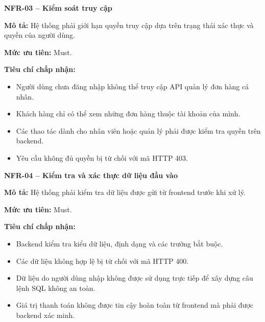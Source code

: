 \documentclass[a4paper]{article}
\begin{document}
\par\ifdim\dimexpr\pagegoal-\pagetotal\relax<6\baselineskip\newpage\fi
{}

\noindent\textbf{NFR-03 – Kiểm soát truy cập}\par\nopagebreak
\begin{list}{}{%
    \setlength{\leftmargin}{0.8cm}%
    \setlength{\rightmargin}{0pt}%
    \setlength{\labelwidth}{0pt}%
    \setlength{\labelsep}{0pt}%
    \setlength{\itemindent}{0pt}%
    \setlength{\listparindent}{0pt}%
    \setlength{\itemsep}{5pt}%
    \setlength{\parsep}{0pt}%
    \setlength{\topsep}{5pt}%
}
\item[] \textbf{Mô tả:} Hệ thống phải giới hạn quyền truy cập dựa trên trạng thái xác thực và quyền của người dùng.
\item[] \textbf{Mức ưu tiên:} Must.
\item[] \textbf{Tiêu chí chấp nhận:} 
\begin{itemize}
\item Người dùng chưa đăng nhập không thể truy cập API quản lý đơn hàng cá nhân.
\item Khách hàng chỉ có thể xem những đơn hàng thuộc tài khoản của mình.
\item Các thao tác dành cho nhân viên hoặc quản lý phải được kiểm tra quyền trên backend.
\item Yêu cầu không đủ quyền bị từ chối với mã HTTP 403.
\end{itemize}
\end{list}

\par\ifdim\dimexpr\pagegoal-\pagetotal\relax<6\baselineskip\newpage\fi
{}

\noindent\textbf{NFR-04 – Kiểm tra và xác thực dữ liệu đầu vào}\par\nopagebreak
\begin{list}{}{%
    \setlength{\leftmargin}{0.8cm}%
    \setlength{\rightmargin}{0pt}%
    \setlength{\labelwidth}{0pt}%
    \setlength{\labelsep}{0pt}%
    \setlength{\itemindent}{0pt}%
    \setlength{\listparindent}{0pt}%
    \setlength{\itemsep}{5pt}%
    \setlength{\parsep}{0pt}%
    \setlength{\topsep}{5pt}%
}
\item[] \textbf{Mô tả:} Hệ thống phải kiểm tra dữ liệu được gửi từ frontend trước khi xử lý.
\item[] \textbf{Mức ưu tiên:} Must.
\item[] \textbf{Tiêu chí chấp nhận:} 
\begin{itemize}
\item Backend kiểm tra kiểu dữ liệu, định dạng và các trường bắt buộc.
\item Các dữ liệu không hợp lệ bị từ chối với mã HTTP 400.
\item Dữ liệu do người dùng nhập không được sử dụng trực tiếp để xây dựng câu lệnh SQL không an toàn.
\item Giá trị thanh toán không được tin cậy hoàn toàn từ frontend mà phải được backend xác minh.
\end{itemize}
\end{list}
\end{document}

